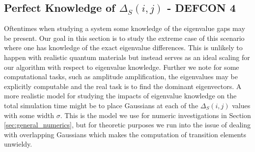 \documentclass{article}
\begin{document}
\subsection{Perfect Knowledge of $\Delta_S(i,j)$ - DEFCON 4} \label{sec:perfect_knowledge}

Oftentimes when studying a system some knowledge of the eigenvalue gaps may be present. Our goal in this section is to study the extreme case of this scenario where one has knowledge of the exact eigenvalue differences. This is unlikely to happen with realistic quantum materials but instead serves as an ideal scaling for our algorithm with respect to eigenvalue knowledge. Further we note for some computational tasks, such as amplitude amplification, the eigenvalues may be explicitly computable and the real task is to find the dominant eigenvectors. A more realistic model for studying the impacts of eigenvalue knowledge on the total simulation time might be to place Gaussians at each of the $\Delta_S(i,j)$ values with some width $\sigma$. This is the model we use for numeric investigations in Section \ref{sec:general_numerics}, but for theoretic purposes we run into the issue of dealing with overlapping Gaussians which makes the computation of transition elements unwieldy. 
\end{document}
